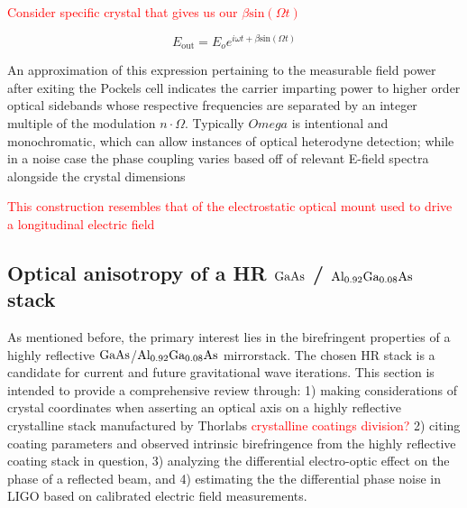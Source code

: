 \textcolor{red}{Consider specific crystal that gives us our $\beta \mathrm{sin}(\Omega t)$}

\begin{equation}\label{eq:inp_EOM}
E_\mathrm{out} = E_o e^{i \omega t + \beta \mathrm{sin}( \Omega t)}
\end{equation}

An approximation of this expression pertaining to the measurable field power after exiting the Pockels cell indicates the carrier imparting power to higher order optical sidebands whose respective frequencies are separated by an integer multiple of the modulation $n \cdot \Omega$. Typically $Omega$ is intentional and monochromatic, which can allow instances of optical heterodyne detection; while in a noise case the phase coupling varies based off of relevant E-field spectra alongside the crystal dimensions

\textcolor{red}{This construction resembles that of the electrostatic optical mount used to drive a longitudinal electric field}

\subsection{Optical anisotropy of a HR $\mathrm{GaAs}$ / $\mathrm{Al_{0.92}Ga_{0.08}As}$ stack}
As mentioned before, the primary interest lies in the birefringent properties of a highly reflective $\mathrm{GaAs}$/$\mathrm{Al_{0.92}Ga_{0.08}As}$ mirrorstack. The chosen HR stack is a candidate for current and future gravitational wave iterations. This section is intended to provide a comprehensive review through: 1) making considerations of crystal coordinates when asserting an optical axis on a highly reflective crystalline stack manufactured by Thorlabs \textcolor{red}{crystalline coatings division?} 2) citing coating parameters and observed intrinsic birefringence from the highly reflective coating stack in question, 3) analyzing the differential electro-optic effect on the phase of a reflected beam, and 4) estimating the the differential phase noise in LIGO based on calibrated electric field measurements.

